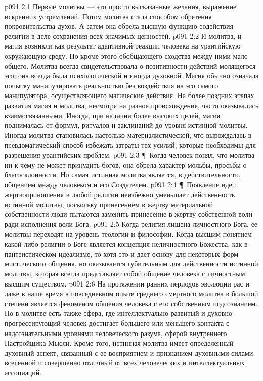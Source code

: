 \vs p091 2:1 Первые молитвы --- это просто высказанные желания, выражение искренних устремлений. Потом молитва стала способом обретения покровительства духов. А затем она обрела высшую функцию содействия религии в деле сохранения всех значимых ценностей.
\vs p091 2:2 И молитва, и магия возникли как результат адаптивной реакции человека на урантийскую окружающую среду. Но кроме этого обобщающего сходства между ними мало общего. Молитва всегда свидетельствовала о позитивности действий молящегося эго; она всегда была психологической и иногда духовной. Магия обычно означала попытку манипулировать реальностью без воздействия на эго самого манипулятора, осуществляющего магические действия. На более поздних этапах развития магия и молитва, несмотря на разное происхождение, часто оказывались взаимосвязанными. Иногда, при наличии более высоких целей, магия поднималась от формул, ритуалов и заклинаний до уровня истинной молитвы. Иногда молитва становилась настолько материалистической, что вырождалась в псевдомагический способ избежать затраты тех усилий, которые необходимы для разрешения урантийских проблем.
\vs p091 2:3 \P\ Когда человек понял, что молитва ни к чему не может принудить богов, она обрела характер мольбы, просьбы о благосклонности. Но самая истинная молитва является, в действительности, общением между человеком и его Создателем.
\vs p091 2:4 \P\ Появление идеи жертвоприношения в любой религии неизбежно уменьшает действенность истинной молитвы, поскольку принесением в жертву материальной собственности люди пытаются заменить принесение в жертву собственной воли ради исполнения воли Бога.
\vs p091 2:5 Когда религия лишена личностного Бога, ее молитвы переходят на уровень теологии и философии. Когда высшим понятием какой\hyp{}либо религии о Боге является концепция неличностного Божества, как в пантеистическом идеализме, то хотя это и дает основу для некоторых форм мистического общения, но оказывается губительным для действенности истинной молитвы, которая всегда представляет собой общение человека с личностным высшим существом.
\vs p091 2:6 На протяжении ранних периодов эволюции рас и даже в наше время в повседневном опыте среднего смертного молитва в большой степени является феноменом общения человека с его собственным подсознанием. Но в молитве есть также сфера, где интеллектуально развитый и духовно прогрессирующий человек достигает большего или меньшего контакта с надсознательными уровнями человеческого разума, сферой внутреннего Настройщика Мысли. Кроме того, истинная молитва имеет определенный духовный аспект, связанный с ее восприятием и признанием духовными силами вселенной и совершенно отличный от всех человеческих и интеллектуальных ассоциаций.
